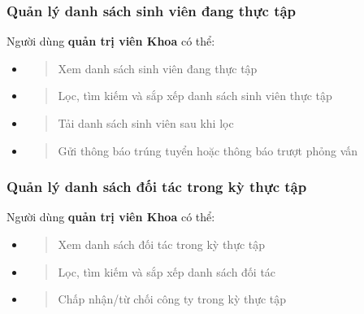 \documentclass[./../main.tex]{subfiles}
\begin{document}
  \hypertarget{quux1ea3n-luxfd-danh-suxe1ch-sinh-viuxean-ux111ang-thux1ef1c-tux1eadp}{%
  \subsubsection{Quản lý danh sách sinh viên đang thực
  tập}\label{quux1ea3n-luxfd-danh-suxe1ch-sinh-viuxean-ux111ang-thux1ef1c-tux1eadp}}
  
  Người dùng \textbf{quản trị viên Khoa} có thể:
  
  \begin{itemize}
  \item
    \begin{quote}
    Xem danh sách sinh viên đang thực tập
    \end{quote}
  \item
    \begin{quote}
    Lọc, tìm kiếm và sắp xếp danh sách sinh viên thực tập
    \end{quote}
  \item
    \begin{quote}
    Tải danh sách sinh viên sau khi lọc
    \end{quote}
  \item
    \begin{quote}
    Gửi thông báo trúng tuyển hoặc thông báo trượt phỏng vấn
    \end{quote}
  \end{itemize}

  \hypertarget{quux1ea3n-luxfd-danh-suxe1ch-ux111ux1ed1i-tuxe1c-trong-kux1ef3-thux1ef1c-tux1eadp}{%
  \subsubsection{Quản lý danh sách đối tác trong kỳ thực
  tập}\label{quux1ea3n-luxfd-danh-suxe1ch-ux111ux1ed1i-tuxe1c-trong-kux1ef3-thux1ef1c-tux1eadp}}
  
  Người dùng \textbf{quản trị viên Khoa} có thể:
  
  \begin{itemize}
  \item
    \begin{quote}
    Xem danh sách đối tác trong kỳ thực tập
    \end{quote}
  \item
    \begin{quote}
    Lọc, tìm kiếm và sắp xếp danh sách đối tác
    \end{quote}
  \item
    \begin{quote}
    Chấp nhận/từ chối công ty trong kỳ thực tập
    \end{quote}
  \end{itemize}
  
\end{document}

